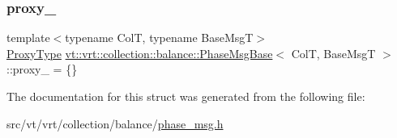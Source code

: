 \mbox{\label{structvt_1_1vrt_1_1collection_1_1balance_1_1_phase_msg_base_a25805b4bc73c3ae8bc20be02820ffc01}} 
\subsubsection{\texorpdfstring{proxy\+\_\+}{proxy\_}}
{\footnotesize\ttfamily template$<$typename ColT, typename Base\+MsgT$>$ \\
\hyperlink{structvt_1_1vrt_1_1collection_1_1balance_1_1_phase_msg_base_a21c9d10c5a8d1386f4e0a1bfa04f482f}{Proxy\+Type} \hyperlink{structvt_1_1vrt_1_1collection_1_1balance_1_1_phase_msg_base}{vt\+::vrt\+::collection\+::balance\+::\+Phase\+Msg\+Base}$<$ ColT, Base\+MsgT $>$\+::proxy\+\_\+ = \{\}\hspace{0.3cm}{\ttfamily [private]}}



The documentation for this struct was generated from the following file\+:\begin{DoxyCompactItemize}
\item 
src/vt/vrt/collection/balance/\hyperlink{phase__msg_8h}{phase\+\_\+msg.\+h}\end{DoxyCompactItemize}
